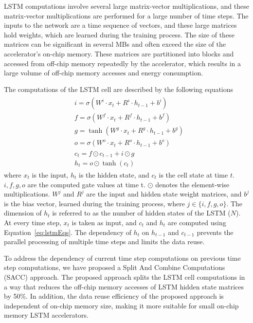 \documentclass[a4paper,10pt]{article}
\begin{document}
LSTM computations involve several large matrix-vector multiplications, and these matrix-vector multiplications are performed for a large number of time steps. The inputs to the network are a time sequence of vectors, and these large matrices hold weights, which are learned during the training process. The size of these matrices can be significant in several MBs and often exceed the size of the accelerator's on-chip memory. These matrices are partitioned into blocks and accessed from off-chip memory repeatedly by the accelerator, which results in a large volume of off-chip memory accesses and energy consumption.

The computations of the LSTM cell are described by the following equations
\begin{align}\label{eq:lstmEqs}
	\begin{split}
		&i{=}{\sigma}(W^i{\cdot}x_t{+}R^i{\cdot}h_{t-1}{+}b^i)\\
		&f{=}{\sigma}(W^f{\cdot}x_t{+}R^f{\cdot}h_{t-1}{+}b^f)\\
		&g{=}{\tanh}(W^g{\cdot}x_t{+}R^g{\cdot}h_{t-1}{+}b^g)\\
		&o{=}{\sigma}(W^o{\cdot}x_t{+}R^o{\cdot}h_{t-1}{+}b^o)\\
		&c_{t}{=}f{\odot}c_{t-1}{+}i{\odot}g\\
		&h_{t}{=}o{\odot}{\tanh}(c_t)
	\end{split}	
\end{align}
where $x_t$ is the input, $h_t$ is the hidden state, and $c_t$ is the cell state at time $t$. $i,f,g,o$ are the computed gate values at time t. $\odot$ denotes the element-wise multiplications. $W^j$ and $R^j$ are the input and hidden state weight matrices, and $b^j$ is the bias vector, learned during the training process, where $j\in\{i,f,g,o\}$. The dimension of $h_t$ is referred to as the number of hidden states of the LSTM ($N$). 
At every time step, $x_t$ is taken as input, and $c_t$ and $h_t$ are computed using Equation~\eqref{eq:lstmEqs}. The dependency of $h_t$ on $h_{t-1}$ and $c_{t-1}$ prevents the parallel processing of multiple time steps and limits the data reuse. 

To address the dependency of current time step computations on previous time step computations, we have proposed a Split And Combine Computations (SACC) approach. The proposed approach splits the LSTM cell computations in a way that reduces the off-chip memory accesses of LSTM hidden state matrices by 50\%. In addition, the data reuse efficiency of the proposed approach is independent of on-chip memory size, making it more suitable for small on-chip memory LSTM accelerators. 
\end{document}

